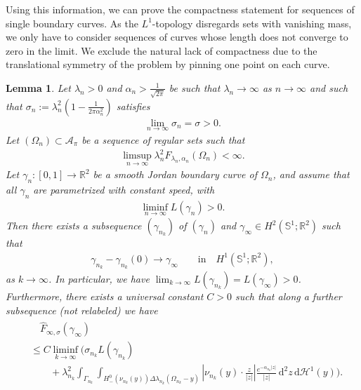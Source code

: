 \documentclass[11pt]{article}
\newcounter{statement}
\numberwithin{statement}{section}
\numberwithin{equation}{section}
\newtheorem{lemma}[statement]{Lemma}
\theoremstyle{remark}
\newcommand{\R}{\mathbb R} 				%
\newcommand{\intd}{\, \mathrm{d}} 				%
\newcommand{\Sph}{{\mathbb S}}				%
\newcommand{\Hd}{\mathcal H}				%
\begin{document}
Using this information, we can prove the compactness statement for
sequences of single boundary curves.  As the $L^1$-topology disregards
sets with vanishing mass, we only have to consider sequences of curves
whose length does not converge to zero in the limit. We exclude
  the natural lack of compactness due to the translational symmetry of
  the problem by pinning one point on each curve. 


\begin{lemma}\label{lemma:compactness_single_curve}
  Let $\lambda_n > 0$ and $\alpha_n > \frac{1}{\sqrt{2\pi}}$ be
    such that $\lambda_n \to \infty$ as $n \to \infty$ and such that
  $\sigma_n := \lambda_n^2 \left( 1- \frac{1}{2\pi \alpha_n^2}
  \right)$ satisfies
  \begin{align}
    \label{eq:siglim}
          \lim_{n\to \infty} \sigma_n = \sigma >0.
	\end{align}
	Let $(\Omega_{n}) \subset \mathcal{A}_\pi$ be a sequence of
        regular sets such that
	\begin{align}\label{eq:compactness_boundedness}
		\limsup_{n \to \infty} \lambda_n^2 F_{\lambda_n,
          \alpha_n} (\Omega_n) <\infty. 
	\end{align}
        Let $\gamma_{n} :[0,1] \to \R^2$ be a smooth Jordan boundary
        curve of $\Omega_{n}$, and assume that all $\gamma_{n}$ are
        parametrized with constant speed, with
	\begin{align} \label{eq:liminfLn}
		 \liminf_{n \to \infty} L(\gamma_{n})>0.
	\end{align}
        Then there exists a subsequence $(\gamma_{n_k})$ of
          $(\gamma_n)$ and
        $\gamma_\infty \in H^2(\Sph^1; \R^2)$ such that
        \begin{align}
          \gamma_{n_k} - \gamma_{n_k}(0) \to \gamma_\infty
          \qquad 
          \text{in} \quad
          H^1(\Sph^1;\R^2),
        \end{align}
        as $k \to \infty$.  In particular, we have
        $\lim_{k \to \infty} L(\gamma_{n_k}) =
        L(\gamma_\infty) >0$.  Furthermore, there exists a universal
        constant $C>0$ such that
        along a further subsequence (not relabeled) we have
	\begin{align}\label{eq:up_to_constants}
	  \begin{split}
            &\quad  \hat F_{\infty,\sigma}(\gamma_\infty)\\
            & \leq C \liminf_{k \to \infty} \Bigg(
            \sigma_{n_k} L(\gamma_{n_k})\\
            & \qquad + \lambda_{n_k}^2 \int_{\Gamma_{n_k}} \int_{
              H^0_- (\nu_{n_k}(y)) \Delta
              \lambda_{n_k}(\Omega_{n_k} - y) } \left| \nu_{n_k}(y)
              \cdot \frac{ z}{|z|} \right|
            \frac{e^{-\alpha_{n_k}|z|}}{|z|} \intd^2 z \intd \Hd^1(y)
            \Bigg).
	  \end{split}
	  \end{align}
\end{lemma}
\end{document}
